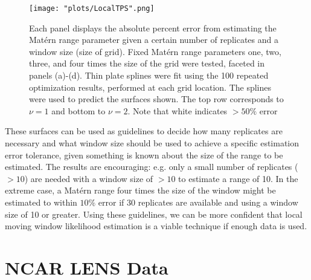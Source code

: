 \documentclass[review]{elsarticle}
\begin{document}
\begin{figure}[h]
    \centering
   \texttt{[image: "plots/LocalTPS".png]}
    \caption{Each panel displays the absolute percent error from estimating the Mat\'ern range parameter given a certain number of replicates and a window size (size of grid). Fixed Mat\'ern range parameters one, two, three, and four times the size of the grid were tested, faceted in panels (a)-(d). Thin plate splines were fit using the 100 repeated optimization results, performed at each grid location. The splines were used to predict the surfaces shown. The top row corresponds to $\nu=1$ and bottom to $\nu=2$. Note that white indicates $>50\%$ error}
    \label{f:2}
\end{figure}

These surfaces can be used as guidelines to decide how many replicates are necessary and what window size should be used to achieve a specific estimation error tolerance, given something is known about the size of the range to be estimated. The results are encouraging: e.g. only a small number of replicates ($>10$) are needed with a window size of $>10$ to estimate a range of 10. In the extreme case, a Mat\'ern range four times the size of the window might be estimated to within $10\%$ error if 30 replicates are available and using a window size of 10 or greater. Using these guidelines, we can be more confident that local moving window likelihood estimation is a viable technique if enough data is used.





\begin{comment}
\section{Data analysis}

In this section, we implement the methods studied in this paper to analyze a data set where it is important to account for nonstationary covariance structure. We first use moving window likelihood estimation to infer spatially varying Mat\'ern parameters. We then translate these into their local SAR covariance parameter equivalents, and we encode the spatially varying SAR parameters into the nonstationary SAR covariance model. This model makes it possible to visualize the resulting nonstationary covariance matrix and efficiently simulate new realizations.
\end{comment}

\section{NCAR LENS Data}
\end{document}

